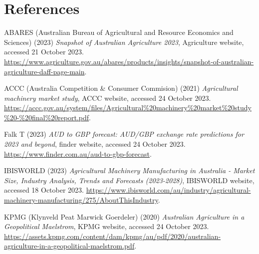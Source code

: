 \documentclass{article}
\begin{document}
\break

\section*{References}

\vspace{1em}

\noindent
ABARES (Australian Bureau of Agricultural and Resource Economics and Sciences) (2023) \emph{Snapshot of Australian Agriculture 2023}, Agriculture website, accessed 21 October 2023. \href{https://www.agriculture.gov.au/abares/products/insights/snapshot-of-australian-agriculture#daff-page-main}{https://www.agriculture.gov.au/abares/products/insights/snapshot-of-australian-agriculture-daff-page-main}.

\vspace{1em}

\noindent
ACCC (Australia Competition \& Consumer Commision) (2021) \emph{Agricultural machinery market study}, ACCC website, accessed 24 October 2023. \href{https://accc.gov.au/system/files/Agricultural%20machinery%20market%20study%20-%20final%20report.pdf}{https://accc.gov.au/system/files/Agricultural\%20machinery\%20market\%20study\%20-\%20final\%20report.pdf}.

\vspace{1em}

\noindent
Falk T (2023) \emph{AUD to GBP forecast: AUD/GBP exchange rate predictions for 2023 and beyond}, finder website, accessed 24 October 2023. \href{https://www.finder.com.au/aud-to-gbp-forecast}{https://www.finder.com.au/aud-to-gbp-forecast}.

\vspace{1em}

\noindent
IBISWORLD (2023) \emph{Agricultural Machinery Manufacturing in Australia - Market Size, Industry Analysis, Trends and Forecasts (2023-2028)}, IBISWORLD website, accessed 18 October 2023. \href{https://www.ibisworld.com/au/industry/agricultural-machinery-manufacturing/275/#AboutThisIndustry}{https://www.ibisworld.com/au/industry/agricultural-machinery-manufacturing/275/AboutThisIndustry}.

\vspace{1em}

\noindent
KPMG (Klynveld Peat Marwick Goerdeler) (2020) \emph{Australian Agriculture in a Geopolitical Maelstrom}, KPMG website, accessed 24 October 2023. \href{https://assets.kpmg.com/content/dam/kpmg/au/pdf/2020/australian-agriculture-in-a-geopolitical-maelstrom.pdf}{https://assets.kpmg.com/content/dam/kpmg/au/pdf/2020/australian-agriculture-in-a-geopolitical-maelstrom.pdf}.
\end{document}

